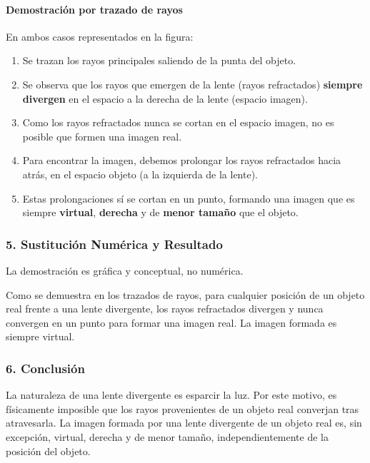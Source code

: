 \paragraph{Demostración por trazado de rayos}
En ambos casos representados en la figura:
\begin{enumerate}
    \item Se trazan los rayos principales saliendo de la punta del objeto.
    \item Se observa que los rayos que emergen de la lente (rayos refractados) \textbf{siempre divergen} en el espacio a la derecha de la lente (espacio imagen).
    \item Como los rayos refractados nunca se cortan en el espacio imagen, no es posible que formen una imagen real.
    \item Para encontrar la imagen, debemos prolongar los rayos refractados hacia atrás, en el espacio objeto (a la izquierda de la lente).
    \item Estas prolongaciones sí se cortan en un punto, formando una imagen que es siempre \textbf{virtual}, \textbf{derecha} y de \textbf{menor tamaño} que el objeto.
\end{enumerate}

\subsubsection*{5. Sustitución Numérica y Resultado}
La demostración es gráfica y conceptual, no numérica.
\begin{cajaresultado}
Como se demuestra en los trazados de rayos, para cualquier posición de un objeto real frente a una lente divergente, los rayos refractados divergen y nunca convergen en un punto para formar una imagen real. La imagen formada es siempre virtual.
\end{cajaresultado}

\subsubsection*{6. Conclusión}
\begin{cajaconclusion}
La naturaleza de una lente divergente es esparcir la luz. Por este motivo, es físicamente imposible que los rayos provenientes de un objeto real converjan tras atravesarla. La imagen formada por una lente divergente de un objeto real es, sin excepción, virtual, derecha y de menor tamaño, independientemente de la posición del objeto.
\end{cajaconclusion}

